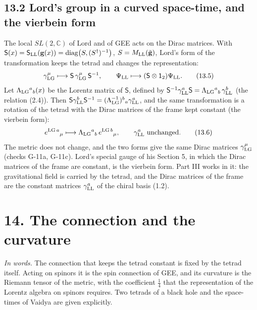 \documentclass[
  10pt,
]{article}
\begin{document}
\hypertarget{lords-group-in-a-curved-space-time-and-the-vierbein-form}{%
\subsection{13.2 Lord's group in a curved space-time, and the vierbein
form}\label{lords-group-in-a-curved-space-time-and-the-vierbein-form}}

The local \(SL(2,\mathbb C)\) of Lord and of GEE acts on the Dirac
matrices. With
\(\mathsf S(x)=\mathsf S_{\rm LL}(\mathbf g(x))=\mathrm{diag}\big(S,(S^\dagger)^{-1}\big)\),
\(S=M_{\rm LL}(\tilde{\mathbf g})\), Lord's form of the transformation
keeps the tetrad and changes the representation:
\[\gamma^\mu_{\rm LG}\longmapsto\mathsf S\,\gamma^\mu_{\rm LG}\,\mathsf S^{-1},\qquad\Psi_{\rm LL}\longmapsto(\mathsf S\otimes\mathsf 1_2)\Psi_{\rm LL}.\tag{13.5}\]
Let \(\Lambda_{\rm LG}{}^a{}_b(x)\) be the Lorentz matrix of
\(\mathsf S\), defined by
\(\mathsf S^{-1}\gamma^a_{\rm LL}\mathsf S=\Lambda_{\rm LG}{}^a{}_b\,\gamma^b_{\rm LL}\)
(the relation (2.4)). Then
\(\mathsf S\gamma^b_{\rm LL}\mathsf S^{-1}=(\Lambda_{\rm LG}^{-1})^b{}_a\gamma^a_{\rm LL}\),
and the same transformation is a rotation of the tetrad with the Dirac
matrices of the frame kept constant (the vierbein form):
\[e^{{\rm LG}\,a}{}_\mu\longmapsto\Lambda_{\rm LG}{}^a{}_b\,e^{{\rm LG}\,b}{}_\mu,\qquad\gamma^a_{\rm LL}\ \text{unchanged}.\tag{13.6}\]
The metric does not change, and the two forms give the same Dirac
matrices \(\gamma^\mu_{\rm LG}\) (checks G-11a, G-11c). Lord's special
gauge of his Section 5, in which the Dirac matrices of the frame are
constant, is the vierbein form. Part III works in it: the gravitational
field is carried by the tetrad, and the Dirac matrices of the frame are
the constant matrices \(\gamma^a_{\rm LL}\) of the chiral basis (1.2).

\hypertarget{the-connection-and-the-curvature}{%
\section{14. The connection and the
curvature}\label{the-connection-and-the-curvature}}

\emph{In words.} The connection that keeps the tetrad constant is fixed
by the tetrad itself. Acting on spinors it is the spin connection of
GEE, and its curvature is the Riemann tensor of the metric, with the
coefficient \(\tfrac14\) that the representation of the Lorentz algebra
on spinors requires. Two tetrads of a black hole and the space-times of
Vaidya are given explicitly.
\end{document}
